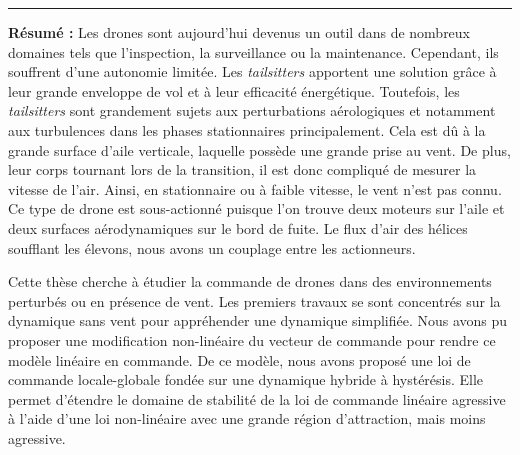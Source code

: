 \pagestyle{empty} %

\begin{vcenterpage} %
\noindent\rule[2pt]{\textwidth}{0.5pt}

{\large\textbf{Résumé :}}
Les drones sont aujourd'hui devenus un outil dans de nombreux domaines tels que l'inspection, la surveillance ou la maintenance. Cependant, ils souffrent d'une autonomie limitée. Les \textit{tailsitters} apportent une solution grâce à leur grande enveloppe de vol et à leur efficacité énergétique. Toutefois, les \textit{tailsitters} sont grandement sujets aux perturbations aérologiques et notamment aux turbulences dans les phases stationnaires principalement. Cela est dû à la grande surface d'aile verticale, laquelle possède une grande prise au vent. De plus, leur corps tournant lors de la transition, il est donc compliqué de mesurer la vitesse de l'air.  Ainsi, en stationnaire ou à faible vitesse, le vent n'est pas connu. Ce type de drone est sous-actionné puisque l'on trouve deux moteurs sur l'aile et deux surfaces aérodynamiques sur le bord de fuite. Le flux d'air des hélices soufflant les élevons, nous avons un couplage entre les actionneurs.

Cette thèse cherche à étudier la commande de drones dans des environnements perturbés ou en présence de vent. Les premiers travaux se sont concentrés sur la dynamique sans vent pour appréhender une dynamique simplifiée. Nous avons pu proposer une modification non-linéaire du vecteur de commande pour rendre ce modèle linéaire en commande. De ce modèle, nous avons proposé une loi de commande locale-globale fondée sur une dynamique hybride à hystérésis. Elle permet d'étendre le domaine de stabilité de la loi de commande linéaire agressive à l'aide d'une loi non-linéaire avec une grande région d'attraction, mais moins agressive.


\end{vcenterpage}
